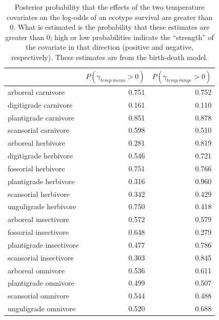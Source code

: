 \documentclass[12pt,letterpaper]{article}
\begin{document}
\begin{table}[ht]
  \centering
  \caption[Posterior probablity of effects of temperature on survival]{Posterior probability that the effects of the two temperature covariates on the log-odds of an ecotype survival are greater than 0. What is estimated is the probability that these estimates are greater than 0; high or low probabilities indicate the ``strength'' of the covariate in that direction (positive and negative, respectively). These estimates are from the birth-death model.}
  \label{tab:surv_temp}
  \begin{tabular}{ l r r }
    \hline
    & \(P(\gamma_{temp\ mean} > 0)\) & \(P(\gamma_{temp\ range} > 0)\) \\ 
    \hline
    arboreal carnivore & 0.751 & 0.752 \\ 
    digitigrade carnivore & 0.161 & 0.110 \\ 
    plantigrade carnivore & 0.851 & 0.878 \\ 
    scansorial carnivore & 0.598 & 0.510 \\ 
    arboreal herbivore & 0.281 & 0.819 \\ 
    digitigrade herbivore & 0.546 & 0.721 \\ 
    fossorial herbivore & 0.751 & 0.766 \\ 
    plantigrade herbivore & 0.316 & 0.960 \\ 
    scansorial herbivore & 0.342 & 0.429 \\ 
    unguligrade herbivore & 0.750 & 0.418 \\ 
    arboreal insectivore & 0.572 & 0.579 \\ 
    fossorial insectivore & 0.648 & 0.279 \\ 
    plantigrade insectivore & 0.477 & 0.786 \\ 
    scansorial insectivore & 0.303 & 0.845 \\ 
    arboreal omnivore & 0.536 & 0.611 \\ 
    plantigrade omnivore & 0.499 & 0.507 \\ 
    scansorial omnivore & 0.544 & 0.488 \\ 
    unguligrade omnivore & 0.520 & 0.688 \\ 
    \hline
  \end{tabular}
\end{table}
\end{document}
